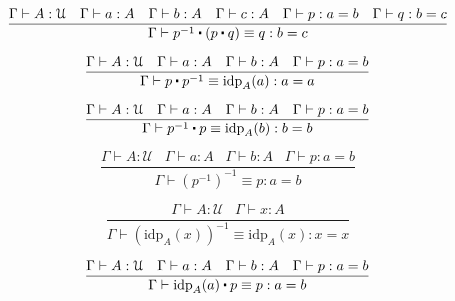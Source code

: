 \documentclass[a4paper,UKenglish,cleveref, autoref, thm-restate]{lipics-v2021}
\newcommand{\UU}{\ensuremath{\mathcal{U}}}
\newcommand{\ct}{%
  \mathchoice{\mathbin{\raisebox{0.5ex}{$\displaystyle\centerdot$}}}%
             {\mathbin{\raisebox{0.5ex}{$\centerdot$}}}%
             {\mathbin{\raisebox{0.25ex}{$\scriptstyle\,\centerdot\,$}}}%
             {\mathbin{\raisebox{0.1ex}{$\scriptscriptstyle\,\centerdot\,$}}}
}
\begin{document}
\begin{equation*}
    \frac{\Gamma \vdash A : \UU \hspace{10pt} \Gamma \vdash a : A \hspace{10pt} \Gamma \vdash b : A \hspace{10pt} \Gamma \vdash c : A \hspace{10pt} \Gamma \vdash p : a = b \hspace{10pt} \Gamma \vdash q : b = c}{\Gamma \vdash p^{-1} \ct (p \ct q) \equiv q : b = c}
\end{equation*}

\begin{equation*}
    \frac{\Gamma \vdash A : \UU \hspace{10pt} \Gamma \vdash a : A \hspace{10pt} \Gamma \vdash b : A \hspace{10pt} \Gamma \vdash p : a = b}{\Gamma \vdash p \ct p^{-1} \equiv \mathrm{idp}_A(a) : a = a}
\end{equation*}

\begin{equation*}
    \frac{\Gamma \vdash A : \UU \hspace{10pt} \Gamma \vdash a : A \hspace{10pt} \Gamma \vdash b : A \hspace{10pt} \Gamma \vdash p : a = b}{\Gamma \vdash p^{-1} \ct p \equiv \mathrm{idp}_A(b) : b = b}
\end{equation*}

\begin{equation*}
    \frac{\Gamma \vdash A : \UU \hspace{10pt} \Gamma \vdash a : A \hspace{10pt} \Gamma \vdash b : A \hspace{10pt} \Gamma \vdash p : a = b}{\Gamma \vdash (p^{-1})^{-1} \equiv p : a = b}
\end{equation*}

\begin{equation*}
    \frac{\Gamma \vdash A : \UU \hspace{10pt} \Gamma \vdash x : A}{\Gamma \vdash (\mathrm{idp}_A(x))^{-1} \equiv \mathrm{idp}_A(x) : x = x}
\end{equation*}

\begin{equation*}
    \frac{\Gamma \vdash A : \UU \hspace{10pt} \Gamma \vdash a : A \hspace{10pt} \Gamma \vdash b : A \hspace{10pt} \Gamma \vdash p : a = b}{\Gamma \vdash \mathrm{idp}_A(a) \ct p \equiv p : a = b}
\end{equation*}
\end{document}
